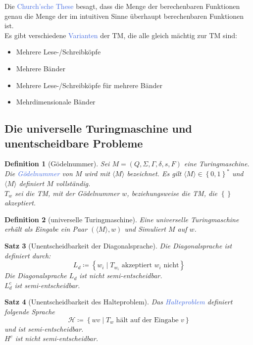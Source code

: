 \documentclass[11pt]{scrartcl}
\newcommand{\tcol}[1]{\textcolor{RoyalBlue}{#1}}
\newcommand{\set}[1]{\left\lbrace #1\right\rbrace}
\theoremstyle{break}
\newtheorem{satz}{Satz}[section]
\newtheorem{defi}[satz]{Definition}
\begin{document}
    Die \tcol{Church'sche These} besagt, dass die Menge der berechenbaren Funktionen genau die Menge der im intuitiven Sinne überhaupt berechenbaren Funktionen ist.\\

    Es gibt verschiedene \tcol{Varianten} der TM, die alle gleich mächtig zur TM sind:
    \begin{itemize}
        \item Mehrere Lese-/Schreibköpfe
        \item Mehrere Bänder
        \item Mehrere Lese-/Schreibköpfe für mehrere Bänder
        \item Mehrdimensionale Bänder
    \end{itemize}


    \subsection{Die universelle Turingmaschine und unentscheidbare Probleme}
	\label{subsec:die-universelle-turingmaschine-und-unentscheidbare-probleme}

    \begin{defi}[Gödelnummer]
        Sei $M=(Q,\Sigma,\Gamma,\delta,s,F)$ eine Turingmaschine.
        Die \tcol{Gödelnummer} von $M$ wird mit $\langle M\rangle$ bezeichnet.
        Es gilt $\langle M\rangle\in\set{0,1}^*$ und $\langle M\rangle$ definiert $M$ vollständig.\\
        $T_w$ sei die TM, mit der Gödelnummer $w$, beziehungsweise die TM, die $\set{}$ akzeptiert.
    \end{defi}

    \begin{defi}[universelle Turingmaschine]
        Eine universelle Turingmaschine erhält als Eingabe ein Paar $(\langle M\rangle,w)$ und Simuliert $M$ auf $w$.
    \end{defi}

    \begin{satz}[Unentscheidbarkeit der Diagonalsprache]
        Die Diagonalsprache ist definiert durch:
        \[L_d\coloneqq\set{w_i\mid T_{w_i}\text{ akzeptiert }w_i\text{ nicht}}\]
        Die Diagonalsprache $L_d$ ist nicht semi-entscheidbar.\\
        $L_d^c$ ist semi-entscheidbar.
    \end{satz}

    \begin{satz}[Unentscheidbarkeit des Halteproblem]
        Das \tcol{Halteproblem} definiert folgende Sprache
        \[\mathcal{H}\coloneqq\set{wv\mid T_w\text{ hält auf der Eingabe }v}\]
        und ist semi-entscheidbar.\\
        $H^c$ ist nicht semi-entscheidbar.
    \end{satz}
\end{document}
